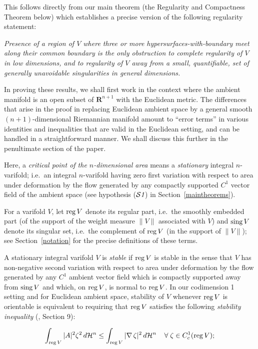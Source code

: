 \documentclass[a4paper,11pt]{amsart}
\begin{document}
This follows directly from our main theorem (the Regularity and Compactness Theorem below) which establishes a precise version of the following regularity statement: 

\textit{Presence of a region of $V$ where three or more hypersurfaces-with-boundary meet along their common boundary is the only obstruction to complete regularity of $V$ in low dimensions, and to regularity of $V$ away from a small, quantifiable, set of generally unavoidable singularities in general dimensions.}

In proving these results, we shall first work in the context where the ambient manifold is an open subset of ${\mathbf R}^{n+1}$ with the Euclidean metric. The differences that arise in the proof in replacing Euclidean ambient space by  a general smooth $(n+1)$-dimensional  Riemannian manifold amount to ``error terms'' in various identities and inequalities that are valid in the Euclidean setting, and can be handled in a straightforward manner. We shall discuss this further in the penultimate section of the paper.
 
Here, a {\em critical point of the $n$-dimensional area} means a \emph{stationary} integral $n$-varifold; i.e.\ an integral $n$-varifold having zero first variation with respect to area under deformation by the flow generated by any compactly supported $C^{1}$ vector field of the ambient space (see hypothesis (${\mathcal S}{\emph 1}$) in  Section~\ref{maintheorems}). 
 

For a varifold $V$, let ${\rm reg} \, V$ denote its regular part, i.e.\  the smoothly embedded part (of the support of the weight measure $\|V\|$ associated with $V$) and 
${\rm sing} \, V$ denote its singular set, i.e.\ the complement of ${\rm reg} \, V$ (in the support of 
$\|V\|$); see Section~\ref{notation} for the precise definitions of these terms. 

A stationary integral varifold  $V$ is {\em stable} if ${\rm reg} \, V$ is stable in the sense that $V$ has non-negative second variation  with respect to area under deformation by the flow generated by any $C^{1}$ ambient vector field which is compactly supported away from ${\rm sing} \, V$ and which, on ${\rm reg} \, V$, is normal to ${\rm reg} \, V$.  In our codimension 1 setting and for Euclidean ambient space,  stability of $V$ whenever ${\rm reg} \, V$ is orientable is equivalent  to requiring that  ${\rm reg} \, V$ satisfies the following  \emph{stability inequality} (\cite{S1}, Section 9):

\begin{equation*}
\int_{{\rm reg} \, V} |A|^{2}\zeta^{2} \,d{\mathcal H}^{n} \leq \int_{{\rm reg} \, V} |\nabla \, \zeta|^{2} \, d{\mathcal H}^{n} \;\;\;\; \forall \;\zeta \in C^{1}_{c}({\rm reg} \, V);
\end{equation*}
\end{document}
